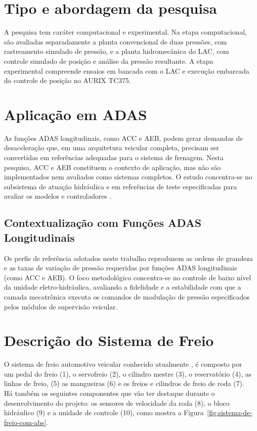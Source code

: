 \section[Tipo e abordagem da pesquisa]{Tipo e abordagem da pesquisa}
\label{sec:metodologia-1}
A pesquisa tem caráter computacional e experimental. Na etapa computacional, são avaliadas separadamente a planta convencional de duas pressões, com rastreamento simulado de pressão, e a planta hidromecânica do LAC, com controle simulado de posição e análise da pressão resultante. A etapa experimental compreende ensaios em bancada com o LAC e execução embarcada do controle de posição no AURIX TC375.


\section{Aplicação em ADAS}
\label{sec:metodologia-3}
As funções ADAS longitudinais, como ACC e AEB, podem gerar demandas de desaceleração que, em uma arquitetura veicular completa, precisam ser convertidas em referências adequadas para o sistema de frenagem. Nesta pesquisa, ACC e AEB constituem o contexto de aplicação, mas não são implementados nem avaliados como sistemas completos. O estudo concentra-se no subsistema de atuação hidráulica e em referências de teste especificadas para avaliar os modelos e controladores \cite{LihuaLuo2016,Linhoff2026}.

\subsection{Contextualização com Funções ADAS Longitudinais}
\label{sebsec:metodologia-3-1}
Os perfis de referência adotados neste trabalho reproduzem as ordens de grandeza e as taxas de variação de pressão requeridas por funções ADAS longitudinais (como ACC e AEB). O foco metodológico concentra-se no controle de baixo nível da unidade eletro-hidráulica, avaliando a fidelidade e a estabilidade com que a camada mecatrônica executa os comandos de modulação de pressão especificados pelos módulos de supervisão veicular.

\section{Descrição do Sistema de Freio}
\label{sec:metodologia-4}

O sistema de freio automotivo veicular conhecido atualmente \cite{Konrad2014}, é composto por um pedal do freio (1), o servofreio (2), o cilindro mestre (3), o reservatório (4), as linhas de freio, (5) as mangueiras (6) e os freios e cilindros de freio de roda (7). Há também os seguintes componentes que vão ter destaque durante o desenvolvimento do projeto: os sensores de velocidade da roda (8), o bloco hidráulico (9) e a unidade de controle (10), como mostra a Figura~\ref{fig:sistema-de-freio-com-abs}.

